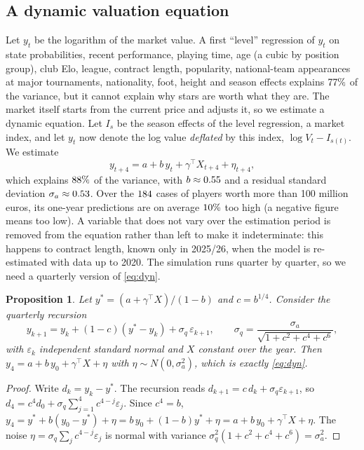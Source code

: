 \documentclass[11pt]{amsart}
\newtheorem{proposition}[theorem]{Proposition}
\theoremstyle{definition}
\theoremstyle{remark}
\begin{document}
\subsection{A dynamic valuation equation}
Let $y_t$ be the logarithm of the market value. A first ``level'' regression of $y_t$ on state probabilities, recent performance, playing time, age (a cubic by position group), club Elo, league, contract length, popularity, national-team appearances at major tournaments, nationality, foot, height and season effects explains $77\%$ of the variance, but it cannot explain why stars are worth what they are. The market itself starts from the current price and adjusts it, so we estimate a dynamic equation. Let $I_s$ be the season effects of the level regression, a market index, and let $y_t$ now denote the log value \emph{deflated} by this index, $\log V_t - I_{s(t)}$. We estimate
\begin{equation}\label{eq:dyn}
y_{t+4} = a + b\,y_t + \gamma^\top X_{t+4} + \eta_{t+4},
\end{equation}
which explains $88\%$ of the variance, with $b\approx0.55$ and a residual standard deviation $\sigma_a\approx0.53$. Over the $184$ cases of players worth more than 100 million euros, its one-year predictions are on average $10\%$ too high (a negative figure means too low). A variable that does not vary over the estimation period is removed from the equation rather than left to make it indeterminate: this happens to contract length, known only in 2025/26, when the model is re-estimated with data up to 2020. The simulation runs quarter by quarter, so we need a quarterly version of \eqref{eq:dyn}.

\begin{proposition}\label{prop:partial}
Let $y^\ast=(a+\gamma^\top X)/(1-b)$ and $c=b^{1/4}$. Consider the quarterly recursion
\[
y_{k+1} = y_k + (1-c)(y^\ast-y_k) + \sigma_q\,\varepsilon_{k+1},\qquad \sigma_q=\frac{\sigma_a}{\sqrt{1+c^2+c^4+c^6}},
\]
with $\varepsilon_k$ independent standard normal and $X$ constant over the year. Then $y_4 = a+b\,y_0+\gamma^\top X + \eta$ with $\eta\sim N(0,\sigma_a^2)$, which is exactly \eqref{eq:dyn}.
\end{proposition}

\begin{proof}
Write $d_k=y_k-y^\ast$. The recursion reads $d_{k+1}=c\,d_k+\sigma_q\varepsilon_{k+1}$, so
$d_4=c^4d_0+\sigma_q\sum_{j=1}^{4}c^{4-j}\varepsilon_j$. Since $c^4=b$,
$y_4 = y^\ast + b(y_0-y^\ast) + \eta = b\,y_0+(1-b)y^\ast+\eta = a+b\,y_0+\gamma^\top X+\eta$.
The noise $\eta=\sigma_q\sum_j c^{4-j}\varepsilon_j$ is normal with variance $\sigma_q^2(1+c^2+c^4+c^6)=\sigma_a^2$.
\end{proof}
\end{document}
